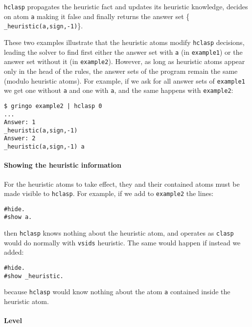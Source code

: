 \texttt{hclasp} propagates the heuristic fact and updates its heuristic knowledge, decides on atom \texttt{a} making it false and finally returns the answer set \{ \texttt{\_heuristic(a,sign,-1)}\}. 

 These two examples illustrate that the heuristic atoms modify \texttt{hclasp} decisions,  leading the solver to find first either the answer set with \texttt{a} (in \texttt{example1}) or the answer set without it (in \texttt{example2}). However, as long as heuristic atoms appear only in the head of the rules, the answer sets of the program remain the same (modulo heuristic atoms). For example, if we ask for all answer sets of \texttt{example1}  we get one without \texttt{a} and one with \texttt{a},  and the same happens with \texttt{example2}: 
\begin{verbatim}
$ gringo example2 | hclasp 0                                                                                
...
Answer: 1                                                                                                           
_heuristic(a,sign,-1)
Answer: 2                                                                                                           
_heuristic(a,sign,-1) a
\end{verbatim}

\paragraph{Showing the heuristic information}

 For the heuristic atoms to take effect, they and their contained atoms must be  made visible to \texttt{hclasp}. For example, if we add to \texttt{example2} the lines: 
\begin{verbatim}
#hide.
#show a.
\end{verbatim}

then \texttt{hclasp} knows nothing about the heuristic atom, and operates as \texttt{clasp} would do normally with \texttt{vsids} heuristic. The same would happen if instead we added:  
\begin{verbatim}
#hide.
#show _heuristic.
\end{verbatim}

 because \texttt{hclasp} would know nothing about the atom \texttt{a} contained inside the heuristic atom. 

\paragraph{Level}

